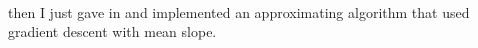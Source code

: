 $$\begin{aligned}
\end{aligned}$$
then I just gave in and implemented an approximating algorithm that used gradient descent with mean slope.
